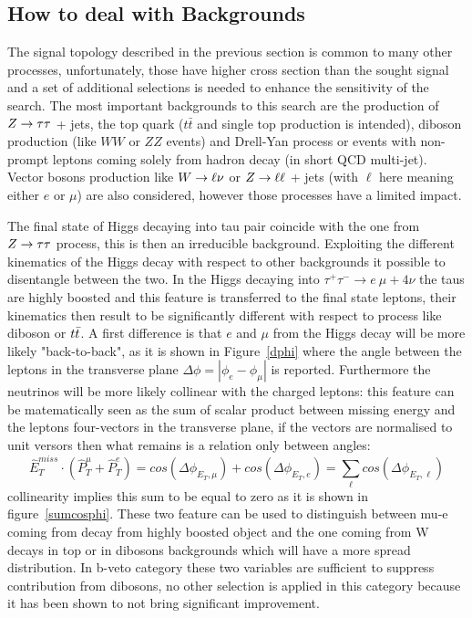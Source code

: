 \subsection{How to deal with Backgrounds}\label{sec:selectiona}
The signal topology described in the previous section is common to many other processes, unfortunately, 
those have higher cross section than the sought signal and a set of additional selections
is needed to enhance the sensitivity of the search.
The most important backgrounds to this search are the production of
 $Z\rightarrow \tau\tau $ + jets, the top quark ($t\bar{t}$ and single top production is intended), diboson production 
(like $WW$ or $ZZ$ events) and Drell-Yan process or events with non-prompt leptons coming 
solely from hadron decay (in short QCD multi-jet).
Vector bosons production like  $W\rightarrow \ell \nu$ or $Z\rightarrow \ell \ell$ + jets (with $\ell$ here meaning either $e$ or $\mu$) are also considered,
however those processes have a limited impact.

The final state of Higgs decaying into tau pair coincide with the one from  $Z\rightarrow \tau\tau$  process, this is then an irreducible 
background. Exploiting the different kinematics of the Higgs decay with respect to other backgrounds it possible to disentangle
between the two. In the Higgs decaying into $\tau^{+} \tau^{-} \rightarrow e ~ \mu + 4\nu$ the taus are highly boosted
and this feature is transferred to the final state leptons, their kinematics then result to be  significantly different 
with respect to process like diboson or $t\bar{t}$. A first difference is that  $e$ and $\mu$ from the Higgs decay will be more likely "back-to-back",
as it is shown in Figure~\ref{dphi} where the angle between the leptons in the transverse plane $\Delta\phi = |\phi_{e} - \phi_{\mu}|$ 
is reported.  Furthermore the neutrinos will be more likely collinear with the charged leptons:
this feature can be matematically seen as the sum of scalar product between missing energy and the leptons four-vectors in the
transverse plane, if the vectors are normalised to unit versors then what remains is a relation only between angles:
$$ \hat{E}_{T}^{miss} \cdot ( \hat{P}_{T}^{\mu} + \hat{P}_{T}^{e} ) = cos(\Delta\phi_{E_{T},\mu}) + cos(\Delta\phi_{E_{T},e}) = \sum_\ell cos(\Delta\phi_{E_{T},\ell}) $$
collinearity implies this sum to be equal to zero as it is shown in figure~\ref{sumcosphi}. 
These two feature can be used to distinguish between mu-e coming from decay from highly 
boosted object and the one coming from W decays in top or in dibosons backgrounds which will have a more spread distribution.
In b-veto category these two variables are sufficient to suppress contribution from dibosons,
no other selection is applied in this category because it has been shown to not bring significant improvement.

